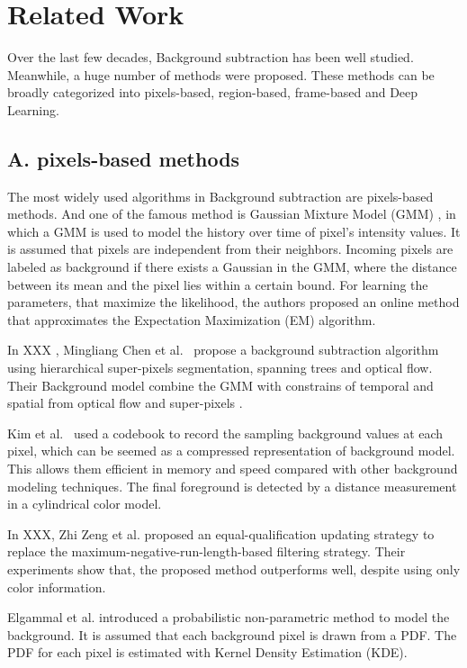 \documentclass[journal]{IEEEtran}
\begin{document}
\section{Related Work}
Over the last few decades, Background subtraction has been well studied. Meanwhile, a huge number of methods were proposed. These methods can be broadly categorized into pixels-based, region-based, frame-based and Deep Learning.

\subsection{A. pixels-based methods}
\label{sec_spa}
The most widely used algorithms in Background subtraction are pixels-based methods.
And one of the famous method is Gaussian Mixture Model (GMM) \cite{Zivkovic2004}, in which a GMM is used to model the history over time of pixel’s intensity values.
It is assumed that pixels are independent from their neighbors.
Incoming pixels are labeled as background if there exists a Gaussian in the GMM, where the distance between its mean and the pixel lies within a certain bound.
For learning the parameters, that maximize the likelihood, the authors proposed an online method that approximates the Expectation Maximization (EM) algorithm.

In XXX , Mingliang Chen et al.\ \cite{2017_TPAMI_GANGWANG} propose a background subtraction algorithm using hierarchical super-pixels segmentation, spanning trees and optical flow.
Their Background model combine the GMM with constrains of temporal and spatial from optical flow and super-pixels \cite{6205760_2012_TPAMI}.

Kim et al.\ \cite{Kim2004} used a codebook to record the sampling background values at each pixel, which can be seemed as a compressed representation of background model.
This allows them efficient in memory and speed compared with other background modeling techniques.
The final foreground is detected by a distance measurement in a cylindrical color model.

In XXX, Zhi Zeng et al.
proposed an equal-qualification updating strategy to replace the maximum-negative-run-length-based filtering strategy.
Their experiments show that, the proposed method outperforms well, despite using only color information.

Elgammal et al.
introduced a probabilistic non-parametric method to model the background.
It is assumed that each background pixel is drawn from a PDF.
The PDF for each pixel is estimated with Kernel Density Estimation (KDE).
\end{document}
